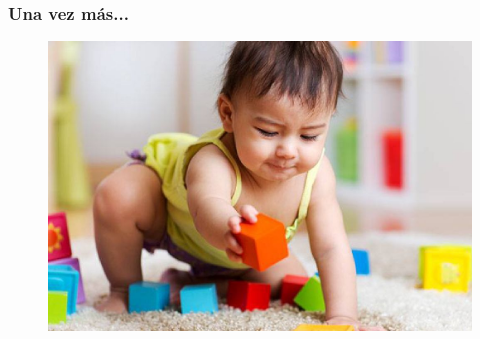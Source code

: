 \documentclass[10pt]{beamer}
\begin{document}
\begin{frame}
    \frametitle{Una vez más...}
    \begin{figure}[!h] 
        \centering
        \includegraphics[width=1\textwidth]{img/bebe}
    \end{figure} 
\end{frame}
\end{document}
